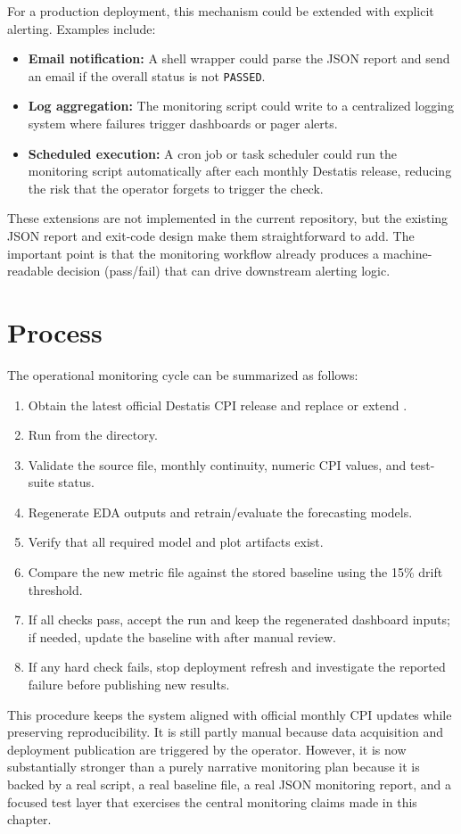 For a production deployment, this mechanism could be extended with explicit alerting. Examples include:

\begin{itemize}
	\item \textbf{Email notification:} A shell wrapper could parse the JSON report and send an email if the overall status is not \texttt{PASSED}.
	\item \textbf{Log aggregation:} The monitoring script could write to a centralized logging system where failures trigger dashboards or pager alerts.
	\item \textbf{Scheduled execution:} A cron job or task scheduler could run the monitoring script automatically after each monthly Destatis release, reducing the risk that the operator forgets to trigger the check.
\end{itemize}

These extensions are not implemented in the current repository, but the existing JSON report and exit-code design make them straightforward to add. The important point is that the monitoring workflow already produces a machine-readable decision (pass/fail) that can drive downstream alerting logic.

\section{Process}

The operational monitoring cycle can be summarized as follows:

\begin{enumerate}
	\item Obtain the latest official Destatis CPI release and replace or extend .
	\item Run  from the  directory.
	\item Validate the source file, monthly continuity, numeric CPI values, and test-suite status.
	\item Regenerate EDA outputs and retrain/evaluate the forecasting models.
	\item Verify that all required model and plot artifacts exist.
	\item Compare the new metric file against the stored baseline using the 15\% drift threshold.
	\item If all checks pass, accept the run and keep the regenerated dashboard inputs; if needed, update the baseline with  after manual review.
	\item If any hard check fails, stop deployment refresh and investigate the reported failure before publishing new results.
\end{enumerate}

This procedure keeps the system aligned with official monthly CPI updates while preserving reproducibility. It is still partly manual because data acquisition and deployment publication are triggered by the operator. However, it is now substantially stronger than a purely narrative monitoring plan because it is backed by a real script, a real baseline file, a real JSON monitoring report, and a focused test layer that exercises the central monitoring claims made in this chapter.
